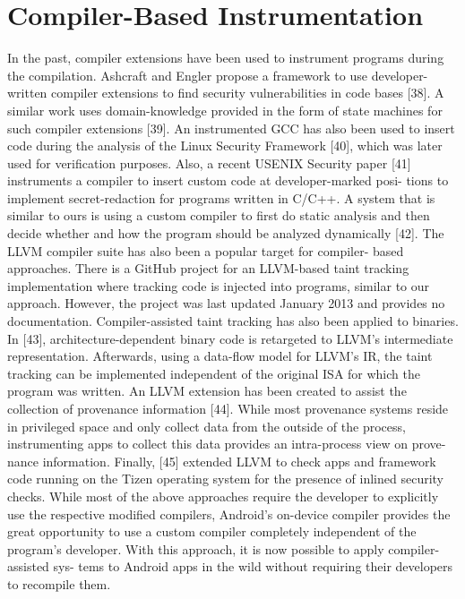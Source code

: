 \section{Compiler-Based Instrumentation}

In the past, compiler extensions have been used to instrument programs during the compilation. Ashcraft and Engler propose a framework to use developer- written compiler extensions to find security vulnerabilities in code bases [38]. A similar work uses domain-knowledge provided in the form of state machines for such compiler extensions [39]. An instrumented GCC has also been used to insert code during the analysis of the Linux Security Framework [40], which was later used for verification purposes. Also, a recent USENIX Security paper [41] instruments a compiler to insert custom code at developer-marked posi- tions to implement secret-redaction for programs written in C/C++. A system that is similar to ours is using a custom compiler to first do static analysis and then decide whether and how the program should be analyzed dynamically [42]. The LLVM compiler suite has also been a popular target for compiler- based approaches. There is a GitHub project for an LLVM-based taint tracking implementation where tracking code is injected into programs, similar to our approach. However, the project was last updated January 2013 and provides no documentation. Compiler-assisted taint tracking has also been applied to binaries. In [43], architecture-dependent binary code is retargeted to LLVM’s intermediate representation. Afterwards, using a data-flow model for LLVM’s IR, the taint tracking can be implemented independent of the original ISA for which the program was written. An LLVM extension has been created to assist the collection of provenance information [44]. While most provenance systems reside in privileged space and only collect data from the outside of the process, instrumenting apps to collect this data provides an intra-process view on prove- nance information. Finally, [45] extended LLVM to check apps and framework code running on the Tizen operating system for the presence of inlined security checks.
While most of the above approaches require the developer to explicitly use the respective modified compilers, Android’s on-device compiler provides the great opportunity to use a custom compiler completely independent of the program’s developer. With this approach, it is now possible to apply compiler-assisted sys- tems to Android apps in the wild without requiring their developers to recompile them.

